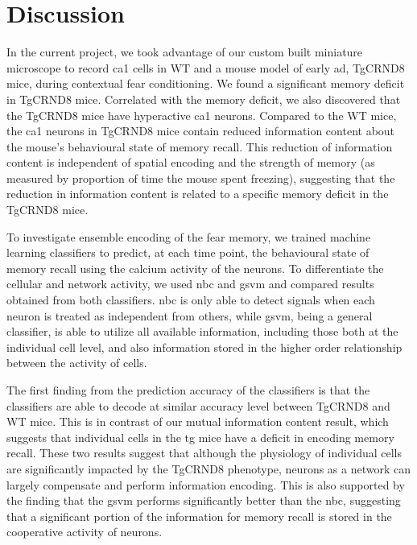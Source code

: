 \section{Discussion}


In the current project, we took advantage of our custom built miniature microscope to record \gls{ca1} cells in WT and a mouse model of early \gls{ad}, TgCRND8 mice, during contextual fear conditioning. We found a significant memory deficit in TgCRND8 mice. Correlated with the memory deficit, we also discovered that the TgCRND8 mice have hyperactive \gls{ca1} neurons. Compared to the WT mice, the \gls{ca1} neurons in TgCRND8 mice contain reduced information content about the mouse's behavioural state of memory recall. This reduction of information content is independent of spatial encoding and the strength of memory (as measured by proportion of time the mouse spent freezing), suggesting that the reduction in information content is related to a specific memory deficit in the TgCRND8 mice.

To investigate ensemble encoding of the fear memory, we trained machine learning classifiers to predict, at each time point, the behavioural state of memory recall using the calcium activity of the neurons. To differentiate the cellular and network activity, we used \gls{nbc} and \gls{gsvm} and compared results obtained from both classifiers. \Gls{nbc} is only able to detect signals when each neuron is treated as independent from others, while \gls{gsvm}, being a general classifier, is able to utilize all available information, including those both at the individual cell level, and also information stored in the higher order relationship between the activity of cells. 

The first finding from the prediction accuracy of the classifiers is that the classifiers are able to decode at similar accuracy level between TgCRND8 and WT mice. This is in contrast of our mutual information content result, which suggests that individual cells in the \gls{tg} mice have a deficit in encoding memory recall. These two results suggest that although the physiology of individual cells are significantly impacted by the TgCRND8 phenotype, neurons as a network can largely compensate and perform information encoding. This is also supported by the finding that the \gls{gsvm} performs significantly better than the \gls{nbc}, suggesting that a significant portion of the information for memory recall is stored in the cooperative activity of neurons. 

